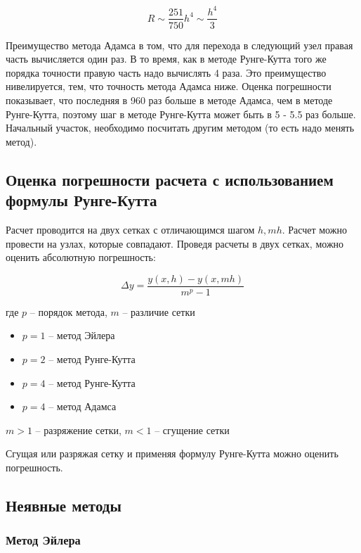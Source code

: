 \begin{equation*}
    R \sim \frac{251}{750} h^4 \sim \frac{h^4}{3}
\end{equation*}

Преимущество метода Адамса в том, что для перехода в следующий
узел правая часть вычисляется один раз. В то время, как в методе
Рунге-Кутта того же порядка точности правую часть надо вычислять
4 раза. Это преимущество нивелируется, тем, что точность метода
Адамса ниже. Оценка погрешности показывает, что последняя в 960
раз больше в методе Адамса, чем в методе Рунге-Кутта, поэтому
шаг в методе Рунге-Кутта может быть в 5 - 5.5 раз больше.
Начальный участок, необходимо посчитать другим методом
(то есть надо менять метод).

\subsection{Оценка погрешности расчета с
использованием формулы Рунге-Кутта}

Расчет проводится на двух сетках с отличающимся шагом
$h, mh$. Расчет можно провести на узлах, которые совпадают.
Проведя расчеты в двух сетках, можно оценить абсолютную
погрешность:

\begin{equation*}
    \Delta y = \frac{y(x, h) - y(x, mh)}{m^p - 1}
\end{equation*}

где $p$ -- порядок метода, $m$ -- различие сетки

\begin{itemize}
    \item $p=1$ -- метод Эйлера
    \item $p=2$ -- метод Рунге-Кутта
    \item $p=4$ -- метод Рунге-Кутта
    \item $p=4$ -- метод Адамса
\end{itemize}

$m > 1$ -- разряжение сетки, $m < 1$ -- сгущение сетки

Сгущая или разряжая сетку и применяя формулу Рунге-Кутта можно
оценить погрешность.

\subsection{Неявные методы}

\subsubsection{Метод Эйлера}

